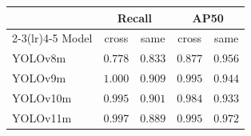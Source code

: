 \begin{tabular}{lcccc}
\toprule
& \multicolumn{2}{c}{Recall} & \multicolumn{2}{c}{AP50} \\
\cmidrule(lr){2-3}\cmidrule(lr){4-5}
Model & cross & same & cross & same \\
\midrule
YOLOv8m & $0.778$ & $0.833$ & $0.877$ & $0.956$ \\
YOLOv9m & $1.000$ & $0.909$ & $0.995$ & $0.944$ \\
YOLOv10m & $0.995$ & $0.901$ & $0.984$ & $0.933$ \\
YOLOv11m & $0.997$ & $0.889$ & $0.995$ & $0.972$ \\
\bottomrule
\end{tabular}

